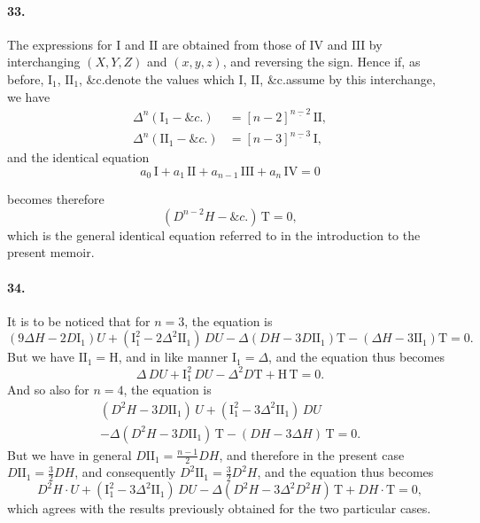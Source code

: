 \documentclass[12pt,a4paper]{article}
\theoremstyle{plain}
\begin{document}
\paragraph{33.}
The  expressions  for  $\mathrm{I}$  and  $\mathrm{II}$  are  obtained  from  those  of  $\mathrm{IV}$  and  $\mathrm{III}$  by
interchanging  $(X, Y, Z)$  and  $(x, y, z)$,  and  reversing  the  sign.  Hence  if,  as  before,
$\mathrm{I}_1$, $\mathrm{II}_1$,  \&c.\@  denote  the  values  which  $\mathrm{I}$, $\mathrm{II}$,  \&c.\@  assume  by  this  interchange,  we  have
\begin{align*}
\Delta^n (\mathrm{I}_1 - \&c.) &= [n-2]^{\underline{n-2}} \, \mathrm{II}, \\
\Delta^n (\mathrm{II}_1 - \&c.) &= [n-3]^{\underline{n-3}} \, \mathrm{I},
\end{align*}
and  the  identical  equation
\[
a_0 \, \mathrm{I} + a_1 \, \mathrm{II} + a_{n-1} \, \mathrm{III} + a_n \, \mathrm{IV} = 0
\]

\newpage

becomes  therefore
\[
(D^{n-2} H - \&c.) \, \mathrm{T} = 0,
\]
which  is  the  general    identical   equation  referred  to   in   the  introduction  to  the  present
memoir.

\paragraph{34.}
It  is  to  be  noticed  that  for  $n = 3$,  the  equation  is
\[
(9 \Delta H - 2 D \mathrm{I}_1) U + (\mathrm{I}_1^2 - 2 \Delta^2 \mathrm{II}_1) \, DU - \Delta (DH - 3 D\mathrm{II}_1) \mathrm{T} - (\Delta H - 3 \mathrm{II}_1) \mathrm{T} = 0.
\]
But  we  have  $\mathrm{II}_1 = \mathrm{H}$,  and  in  like  manner  $\mathrm{I}_1 = \Delta$,  and  the  equation  thus  becomes
\[
\Delta \, DU + \mathrm{I}_1^2 \, DU - \Delta^2 D\mathrm{T} + \mathrm{H} \, \mathrm{T} = 0.
\]
And  so  also  for  $n = 4$,  the  equation  is
\begin{multline*}
(D^2 H - 3 D\mathrm{II}_1) \, U + (\mathrm{I}_1^2 - 3 \Delta^2 \mathrm{II}_1) \, DU \\
- \Delta (D^2 H - 3 D\mathrm{II}_1) \, \mathrm{T} - (DH - 3 \Delta H) \, \mathrm{T} = 0.
\end{multline*}
But  we  have  in  general  $D\mathrm{II}_1 = \frac{n-1}{2} DH$,  and  therefore  in  the  present  case  $D\mathrm{II}_1 = \frac{3}{2} DH$,
and   consequently   $D^2 \mathrm{II}_1 = \frac{3}{2} D^2 H$,  and  the  equation  thus  becomes
\[
D^2 H \cdot U + (\mathrm{I}_1^2 - 3 \Delta^2 \mathrm{II}_1) \, DU - \Delta (D^2 H - 3 \Delta^2 D^2 H) \, \mathrm{T} + DH \cdot \mathrm{T} = 0,
\]
which  agrees  with  the  results  previously  obtained  for  the  two  particular  cases.
\end{document}
